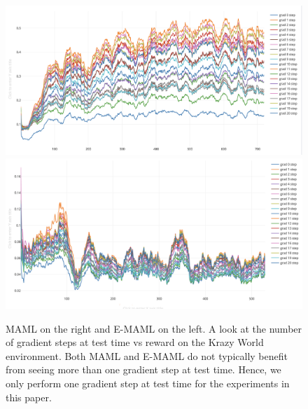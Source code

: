 \documentclass{article} %
\begin{document}
\begin{figure}[H]
\begin{center}
\includegraphics[scale=0.16]{bradly_curves/emaml-20-0.png}%
\includegraphics[scale=0.16]{bradly_curves/maml-20-0.png}
\end{center}
\caption{MAML on the right and E-MAML on the left. A look at the number of gradient steps at test time vs reward on the Krazy World environment. Both MAML and E-MAML do not typically benefit from seeing more than one gradient step at test time. Hence, we only perform one gradient step at test time for the experiments in this paper.}
\label{fig:maml-grad-steps}
\end{figure} 


 


\end{document}
